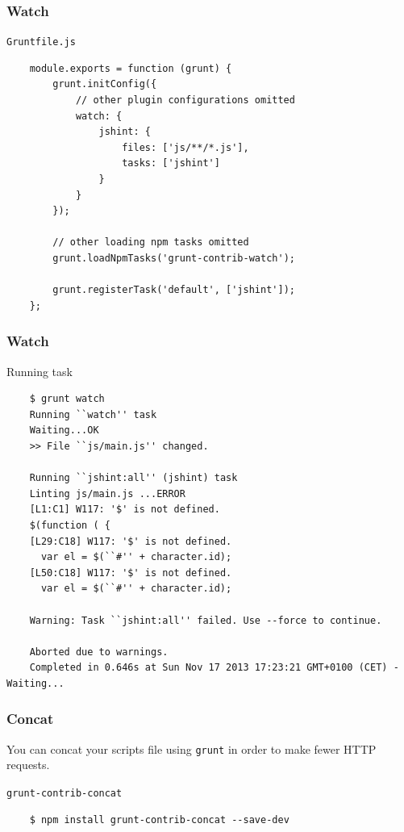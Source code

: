 \begin{frame}[fragile]
  \frametitle{Watch}

  \begin{block}{\texttt{Gruntfile.js}}
    {\tiny
    \begin{verbatim}
    module.exports = function (grunt) {
        grunt.initConfig({
            // other plugin configurations omitted
            watch: {
                jshint: {
                    files: ['js/**/*.js'],
                    tasks: ['jshint']
                }
            }
        });

        // other loading npm tasks omitted
        grunt.loadNpmTasks('grunt-contrib-watch');

        grunt.registerTask('default', ['jshint']);
    };
    \end{verbatim}
    }
  \end{block}
\end{frame}

\begin{frame}[fragile]
  \frametitle{Watch}

  \begin{block}{Running task}
    {\tiny
    \begin{verbatim}
    $ grunt watch
    Running ``watch'' task
    Waiting...OK
    >> File ``js/main.js'' changed.

    Running ``jshint:all'' (jshint) task
    Linting js/main.js ...ERROR
    [L1:C1] W117: '$' is not defined.
    $(function ( {
    [L29:C18] W117: '$' is not defined.
      var el = $(``#'' + character.id);
    [L50:C18] W117: '$' is not defined.
      var el = $(``#'' + character.id);

    Warning: Task ``jshint:all'' failed. Use --force to continue.

    Aborted due to warnings.
    Completed in 0.646s at Sun Nov 17 2013 17:23:21 GMT+0100 (CET) - Waiting...
    \end{verbatim}
    }
  \end{block}
\end{frame}

\begin{frame}[fragile]
  \frametitle{Concat}

  You can concat your scripts file using \texttt{grunt} in order to make fewer HTTP requests.

  \pause

  \begin{block}{\texttt{grunt-contrib-concat}}
    {\tiny
    \begin{verbatim}
    $ npm install grunt-contrib-concat --save-dev
    \end{verbatim}
    }
  \end{block}
\end{frame}

